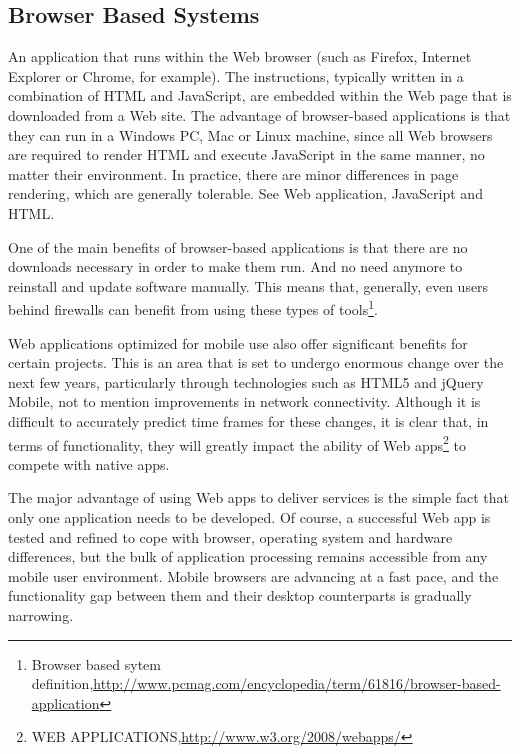 \subsection{Browser Based Systems}
An application that runs within the Web browser (such as Firefox, Internet Explorer or Chrome, for example). The instructions, typically written in a combination of HTML and JavaScript, are embedded within the Web page that is downloaded from a Web site. The advantage of browser-based applications is that they can run in a Windows PC, Mac or Linux machine, since all Web browsers are required to render HTML and execute JavaScript in the same manner, no matter their environment. In practice, there are minor differences in page rendering, which are generally tolerable. See Web application, JavaScript and HTML.

One of the main benefits of browser-based applications is that there are no downloads necessary in order to make them run. And no need anymore to reinstall and update software manually. This means that, generally, even users behind firewalls can benefit from using these types of tools\footnote{Browser based sytem definition,\url{http://www.pcmag.com/encyclopedia/term/61816/browser-based-application}}.

Web applications optimized for mobile use also offer significant benefits for certain projects. This is an area that is set to undergo enormous change over the next few years, particularly through technologies such as HTML5 and jQuery Mobile, not to mention improvements in network connectivity. Although it is difficult to accurately predict time frames for these changes, it is clear that, in terms of functionality, they will greatly impact the ability of Web apps\footnote{WEB APPLICATIONS,\url{http://www.w3.org/2008/webapps/}} to compete with native apps.

The major advantage of using Web apps to deliver services is the simple fact that only one application needs to be developed. Of course, a successful Web app is tested and refined to cope with browser, operating system and hardware differences, but the bulk of application processing remains accessible from any mobile user environment. Mobile browsers are advancing at a fast pace, and the functionality gap between them and their desktop counterparts is gradually narrowing.

